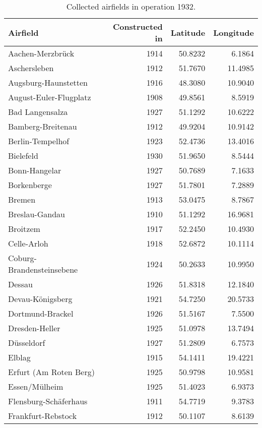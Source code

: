 \begin{table}[h!]
\centering
\caption{Collected airfields in operation 1932.\label{tab:airfields}} 
\begingroup\scriptsize
\begin{tabular}{p{2.8cm}rrr}
  \toprule
Airfield & Constructed in & Latitude & Longitude \\ 
  \midrule
Aachen-Merzbrück & 1914 & 50.8232 & 6.1864 \\ 
  Aschersleben & 1912 & 51.7670 & 11.4985 \\ 
  Augsburg-Haunstetten & 1916 & 48.3080 & 10.9040 \\ 
  August-Euler-Flugplatz & 1908 & 49.8561 & 8.5919 \\ 
  Bad Langensalza & 1927 & 51.1292 & 10.6222 \\ 
  Bamberg-Breitenau & 1912 & 49.9204 & 10.9142 \\ 
  Berlin-Tempelhof & 1923 & 52.4736 & 13.4016 \\ 
  Bielefeld & 1930 & 51.9650 & 8.5444 \\ 
  Bonn-Hangelar & 1927 & 50.7689 & 7.1633 \\ 
  Borkenberge & 1927 & 51.7801 & 7.2889 \\ 
   \midrule
Bremen  & 1913 & 53.0475 & 8.7867 \\ 
  Breslau-Gandau & 1910 & 51.1292 & 16.9681 \\ 
  Broitzem & 1917 & 52.2450 & 10.4930 \\ 
  Celle-Arloh & 1918 & 52.6872 & 10.1114 \\ 
  Coburg-Brandensteinsebene & 1924 & 50.2633 & 10.9950 \\ 
  Dessau & 1926 & 51.8318 & 12.1840 \\ 
  Devau-Königsberg & 1921 & 54.7250 & 20.5733 \\ 
  Dortmund-Brackel & 1926 & 51.5167 & 7.5500 \\ 
  Dresden-Heller & 1925 & 51.0978 & 13.7494 \\ 
  Düsseldorf  & 1927 & 51.2809 & 6.7573 \\ 
   \midrule
Elblag & 1915 & 54.1411 & 19.4221 \\ 
  Erfurt (Am Roten Berg) & 1925 & 50.9798 & 10.9581 \\ 
  Essen/Mülheim & 1925 & 51.4023 & 6.9373 \\ 
  Flensburg-Schäferhaus & 1911 & 54.7719 & 9.3783 \\ 
  Frankfurt-Rebstock & 1912 & 50.1107 & 8.6139 \\ 

\end{tabular}
\end{table}
